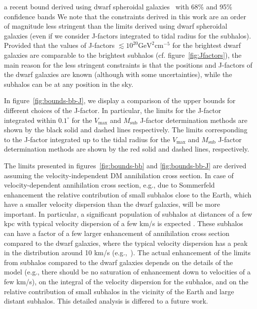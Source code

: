  a recent bound derived using dwarf spheroidal galaxies~\cite{2024PhRvD.109f3024M} with 68\% and 95\% confidence bands 
We note that the constraints derived in this work are an order of magnitude less stringent than the limits derived using dwarf spheroidal galaxies (even if we consider J-factors integrated to tidal radius for the subhalos).
Provided that the values of J-factors $\lesssim 10^{20} \mathrm{GeV^2 cm^{-5}} $ for the brightest dwarf galaxies \citep{2024PhRvD.109f3024M} are comparable to the brightest subhalos (cf. figure~\ref{fig:Jfactors}), the main reason for the less stringent constraints is that the positions and J-factors of the dwarf galaxies are known (although with some uncertainties), while the subhalos can be at any position in the sky.

In figure~\ref{fig:bounds-bb-J}, we display a comparison of the upper bounds for different choices of the J-factor.
In particular, the limits for the J-factor integrated within $0.1^\circ$ for the $V_\textrm{max}$ and $M_\textrm{sub}$ J-factor
determination methods are shown by the black solid and dashed lines respectively. 
The limits corresponding to the J-factor integrated up to the tidal radius for 
the $V_\textrm{max}$ and $M_\textrm{sub}$ J-factor determination methods are shown by the red solid and dashed lines, respectively.



The limits presented in figures~\ref{fig:bounds-bb} and \ref{fig:bounds-bb-J} are derived assuming the velocity-independent DM annihilation cross section.
In case of velocity-dependent annihilation cross section, e.g., due to Sommerfeld enhancement \cite{2009PhRvD..79a5014A, Piccirillo:2022qet, Lacroix:2022cjm, Facchinetti:2022jtd}
the relative contribution of small subhalos close to the Earth, which have a smaller velocity dispersion than the dwarf galaxies, will be more important.
In particular, a significant population of subhalos at distances of a few kpc with typical velocity dispersion of a few km/s is expected \cite{2024MNRAS.530.2496A}.
These subhalos can have a factor of a few larger enhancement of annihilation cross section compared to the dwarf galaxies, where the typical velocity dispersion has a peak in the distribution around 10 km/s (e.g.,~\cite{2018JCAP...04..035L}).
The actual enhancement of the limits from subhalos compared to the dwarf galaxies depends on the details of the model (e.g., there should be no saturation of enhancement down to velocities of a few km/s), on the integral of the velocity dispersion for the subhalos, and on the relative contribution of small subhalos in the vicinity of the Earth and large distant subhalos.
This detailed analysis is differed to a future work.

